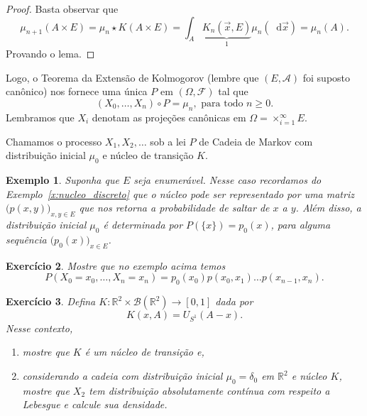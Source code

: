 \documentclass[reqno, final]{book}
\newcommand*\1{\mathds{1}}
\newtheorem{example}{Exemplo}[section]
\newtheorem{exercise}[example]{Exercício}
\renewcommand*\d{\mathop{}\!\mathrm{d}}
\begin{document}
\begin{proof}
  Basta observar que
  \begin{equation}
    \mu_{n+1}(A \times E) = \mu_n \star K (A \times E) = \int_{A} \underbrace{K_n (\vec{x}, E)}_1 \mu_n(\d \vec{x}) = \mu_n(A).
  \end{equation}
  Provando o lema.
\end{proof}

Logo, o Teorema da Extensão de Kolmogorov (lembre que $(E, \mathcal{A})$ foi suposto canônico) nos fornece uma única $P$ em $(\Omega, \mathcal{F})$ tal que
\begin{equation}
  (X_0, \dots, X_n) \circ P = \mu_n, \text{ para todo $n \geq 0$}.
\end{equation}
Lembramos que $X_i$ denotam as projeções canônicas em $\Omega = \times_{i=1}^\infty E$.

Chamamos o processo $X_1, X_2, \dots$ sob a lei $P$ de Cadeia de Markov  com distribuição inicial $\mu_0$ e núcleo de transição $K$.

\begin{example}
  Suponha que $E$ seja enumerável.
  Nesse caso recordamos do Exemplo~\ref{x:nucleo_discreto} que o núcleo pode ser representado por uma matriz $\big(p(x,y)\big)_{x,y \in E}$ que nos retorna a probabilidade de saltar de $x$ a $y$.
  Além disso, a distribuição inicial $\mu_0$ é determinada por $P(\{x\}) = p_0(x)$, para alguma sequência $\big(p_0(x)\big)_{x \in E}$.
\end{example}

\begin{exercise}
  Mostre que no exemplo acima temos
  \begin{equation}
    P(X_0 = x_0, \dots, X_n = x_n) = p_0(x_0) p(x_0, x_1) \dots p(x_{n-1}, x_n).
  \end{equation}
\end{exercise}

\begin{exercise}
  Defina $K:\mathbb{R}^2 \times \mathcal{B}(\mathbb{R}^2) \to [0,1]$ dada por
  \begin{equation}
    K(x, A) = U_{S^1}(A - x).
  \end{equation}
  Nesse contexto,
  \begin{enumerate}[\quad a)]
  \item mostre que $K$ é um núcleo de transição e,
  \item considerando a cadeia com distribuição inicial $\mu_0 = \delta_0$ em $\mathbb{R}^2$ e núcleo $K$, mostre que $X_2$ tem distribuição absolutamente contínua com respeito a Lebesgue e calcule sua densidade.
  \end{enumerate}
\end{exercise}
\end{document}
